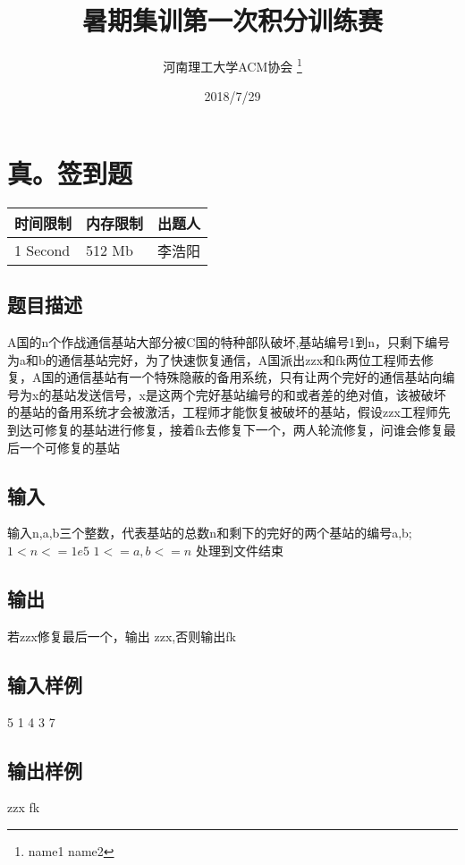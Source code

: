 \documentclass[12pt, a4paper]{article}
\title{暑期集训第一次积分训练赛}
\author{河南理工大学ACM协会 \thanks{name1 name2}}
\date{2018/7/29}
\begin{document}
\maketitle\newpage


\section{真。签到题}

\begin{table}[!h]
  \centering
  \begin{tabular}{l|l|l}
  时间限制 & 内存限制 & 出题人 \\
  \hline
  1 Second & 512 Mb & 李浩阳 \\
\end{tabular}
\end{table}

\subsection*{题目描述}

A国的n个作战通信基站大部分被C国的特种部队破坏,基站编号1到n，只剩下编号为a和b的通信基站完好，为了快速恢复通信，A国派出zzx和fk两位工程师去修复，A国的通信基站有一个特殊隐蔽的备用系统，只有让两个完好的通信基站向编号为x的基站发送信号，x是这两个完好基站编号的和或者差的绝对值，该被破坏的基站的备用系统才会被激活，工程师才能恢复被破坏的基站，假设zzx工程师先到达可修复的基站进行修复，接着fk去修复下一个，两人轮流修复，问谁会修复最后一个可修复的基站

\subsection*{输入}

输入n,a,b三个整数，代表基站的总数n和剩下的完好的两个基站的编号a,b;\newline
$1 < n <= 1e5 $\newline
$1<=a,b<=n$\newline
处理到文件结束
\subsection*{输出}

若zzx修复最后一个，输出 zzx,否则输出fk

\subsection*{输入样例}

5 1 4 3 7

\subsection*{输出样例}

zzx\newline 
fk

\end{document}
